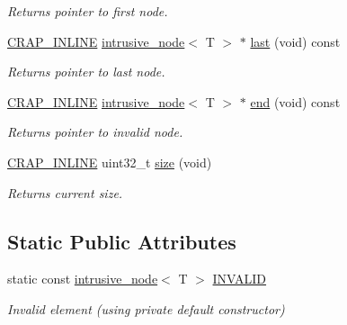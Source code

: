 \begin{DoxyCompactItemize}
\begin{DoxyCompactList}\small\item\em Returns pointer to first node. \end{DoxyCompactList}\item 
\hyperlink{config__x86_8h_a5a40526b8d842e7ff731509998bb0f1c}{C\+R\+A\+P\+\_\+\+I\+N\+L\+I\+N\+E} \hyperlink{classcrap_1_1intrusive__node}{intrusive\+\_\+node}$<$ T $>$ $\ast$ \hyperlink{singletoncrap_1_1intrusive__list_afebe2ecdc59189f6ae3a944d647be6cd}{last} (void) const 
\begin{DoxyCompactList}\small\item\em Returns pointer to last node. \end{DoxyCompactList}\item 
\hyperlink{config__x86_8h_a5a40526b8d842e7ff731509998bb0f1c}{C\+R\+A\+P\+\_\+\+I\+N\+L\+I\+N\+E} \hyperlink{classcrap_1_1intrusive__node}{intrusive\+\_\+node}$<$ T $>$ $\ast$ \hyperlink{singletoncrap_1_1intrusive__list_a7d5848faf582d03caa71dce551c9ba60}{end} (void) const 
\begin{DoxyCompactList}\small\item\em Returns pointer to invalid node. \end{DoxyCompactList}\item 
\hyperlink{config__x86_8h_a5a40526b8d842e7ff731509998bb0f1c}{C\+R\+A\+P\+\_\+\+I\+N\+L\+I\+N\+E} uint32\+\_\+t \hyperlink{singletoncrap_1_1intrusive__list_ab1878553d19f6d17bb86f4231ada31d6}{size} (void)
\begin{DoxyCompactList}\small\item\em Returns current size. \end{DoxyCompactList}\end{DoxyCompactItemize}
\subsection*{Static Public Attributes}
\begin{DoxyCompactItemize}
\item 
static const \hyperlink{classcrap_1_1intrusive__node}{intrusive\+\_\+node}$<$ T $>$ \hyperlink{singletoncrap_1_1intrusive__list_ad77a5b419dceada31c38cde7c8e75196}{I\+N\+V\+A\+L\+I\+D}
\begin{DoxyCompactList}\small\item\em Invalid element (using private default constructor) \end{DoxyCompactList}\end{DoxyCompactItemize}


